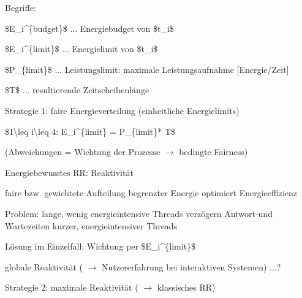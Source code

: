 \documentclass[a4paper]{article}
\begin{document}
\begin{multicols}{3}
    \begin{itemize*}
        \item
        Begriffe:
        \begin{itemize*}
            \item \$E\_i\^{}\{budget\}\$ ... Energiebudget von \$t\_i\$
            \item \$E\_i\^{}\{limit\}\$ ... Energielimit von \$t\_i\$
            \item \$P\_\{limit\}\$ ... Leistungslimit: maximale Leistungsaufnahme {[}Energie/Zeit{]}
            \item \$T\$ ... resultierende Zeitscheibenlänge
        \end{itemize*}
        \item
        Strategie 1: faire Energieverteilung (einheitliche Energielimits)
        \begin{itemize*}
            \item \$1\textbackslash leq i\textbackslash leq 4: E\_i\^{}\{limit\} = P\_\{limit\}* T\$
            \item (Abweichungen = Wichtung der Prozesse $\rightarrow$  bedingte Fairness)
        \end{itemize*}
    \end{itemize*}

    Energiebewusstes RR: Reaktivität

    \begin{itemize*}
        \item
        faire bzw. gewichtete Aufteilung begrenzter Energie optimiert
        Energieeffizienz
        \item
        Problem: lange, wenig energieintensive Threads verzögern Antwort-und
        Wartezeiten kurzer, energieintensiver Threads
        \begin{itemize*}
            \item Lösung im Einzelfall: Wichtung per \$E\_i\^{}\{limit\}\$
            \item globale Reaktivität ( $\rightarrow$  Nutzererfahrung bei interaktiven Systemen) ...?
        \end{itemize*}
        \item
        Strategie 2: maximale Reaktivität ( $\rightarrow$
        klassisches RR)
    \end{itemize*}


\end{multicols}
\end{document}
